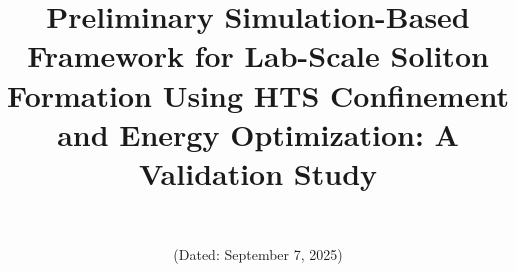 \documentclass[12pt,a4paper]{article}
\begin{document}
\title{Preliminary Simulation-Based Framework for Lab-Scale Soliton Formation Using HTS Confinement and Energy Optimization: A Validation Study}

\author{\authorname\\\texttt{\authoremail}}
\date{(Dated: September 7, 2025)}

\maketitle
\end{document}
